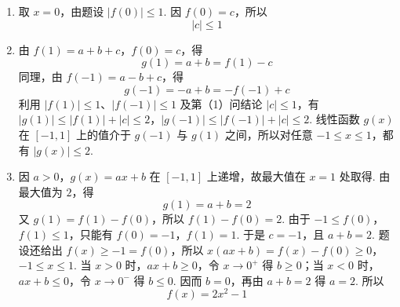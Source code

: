 \begin{solution}
\begin{enumerate}
\item 取 \(x=0\)，由题设 \(\left|f(0)\right|\leqslant1\). 因 \(f(0)=c\)，所以
\[
\left|c\right|\leqslant1
\]

\item 由 \(f(1)=a+b+c\)，\(f(0)=c\)，得
\[
g(1)=a+b=f(1)-c
\]
同理，由 \(f(-1)=a-b+c\)，得
\[
g(-1)=-a+b=-f(-1)+c
\]
利用 \(\left|f(1)\right|\leqslant1\)、\(\left|f(-1)\right|\leqslant1\) 及第（1）问结论 \(\left|c\right|\leqslant1\)，有
\(\left|g(1)\right|\leqslant\left|f(1)\right|+\left|c\right|\leqslant2\)，\(\left|g(-1)\right|\leqslant\left|f(-1)\right|+\left|c\right|\leqslant2\).
线性函数 \(g(x)\) 在 \([-1,1]\) 上的值介于 \(g(-1)\) 与 \(g(1)\) 之间，所以对任意 \(-1\leqslant x\leqslant1\)，都有 \(\left|g(x)\right|\leqslant2\).

\item 因 \(a>0\)，\(g(x)=ax+b\) 在 \([-1,1]\) 上递增，故最大值在 \(x=1\) 处取得. 由最大值为 \(2\)，得
\[
g(1)=a+b=2
\]
又 \(g(1)=f(1)-f(0)\)，所以 \(f(1)-f(0)=2\). 由于 \(-1\leqslant f(0)\)，\(f(1)\leqslant1\)，只能有
\(f(0)=-1\)，\(f(1)=1\).
于是 \(c=-1\)，且 \(a+b=2\). 题设还给出 \(f(x)\geqslant-1=f(0)\)，所以
\(x(ax+b)=f(x)-f(0)\geqslant0\)，\(-1\leqslant x\leqslant1\).
当 \(x>0\) 时，\(ax+b\geqslant0\)，令 \(x\to0^+\) 得 \(b\geqslant0\)；当 \(x<0\) 时，\(ax+b\leqslant0\)，令 \(x\to0^-\) 得 \(b\leqslant0\). 因而 \(b=0\)，再由 \(a+b=2\) 得 \(a=2\). 所以
\[
f(x)=2x^2-1
\]
\end{enumerate}
\end{solution}
